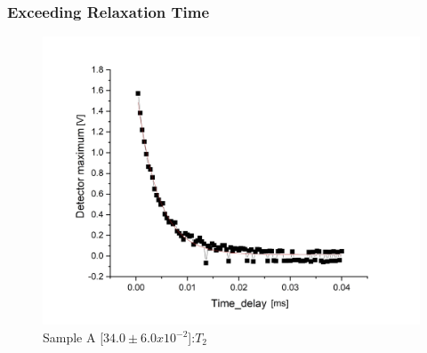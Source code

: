 \begin{frame}
    \frametitle{Exceeding Relaxation Time}
    \begin{figure}[htbp!]
        \begin{center}
            \includegraphics[scale=0.07]{./images/figures/t_plots_appendix/a_t-2.jpg}
        \end{center}
                \caption{Sample A [$ 34.0 \pm 6.0 x 10^{-2}$]:$ T_2$}
        \label{fig:a_t2}
    \end{figure}
\end{frame}
